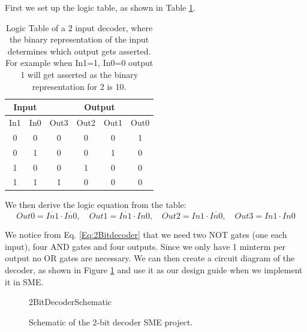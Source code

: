         First we set up the logic table, as shown in Table \ref{LogicTable:2BitDecoder}. 
        \begin{table}[h!]
            \centering
            \begin{tabular}{|c|c||c|c|c|c|}
                \hline
                \multicolumn{2}{|c||}{\textbf{Input}}& \multicolumn{4}{c|}{\textbf{Output}}                  \\ \hline
                In1        & In0        & Out3 & Out2 & Out1 & Out0 \\ \hline
                0          & 0          & 0    & 0    & 0    & 1    \\ \hline
                0          & 1          & 0    & 0    & 1    & 0    \\ \hline
                1          & 0          & 0    & 1    & 0    & 0    \\ \hline
                1          & 1          & 1    & 0    & 0    & 0    \\ \hline
            \end{tabular}
            \caption{Logic Table of a 2 input decoder, where the binary representation of the input determines which output gets asserted. For example when In1=1, In0=0 output 1 will get asserted as the binary representation for 2 is 10.}
            \label{LogicTable:2BitDecoder}
        \end{table}
    
        We then derive the logic equation from the table: 
        \begin{equation}
        \label{Eq:2Bitdecoder}
                Out0 = \overline{In1} \cdot \overline{In0}, \quad
                Out1 = \overline{In1} \cdot In0, \quad
                Out2 = In1 \cdot \overline{In0}, \quad
                Out3 = In1 \cdot In0
        \end{equation}
        
        We notice from Eq. \ref{Eq:2Bitdecoder} that we need two NOT gates (one each input), four AND gates and four outputs. Since we only have 1 minterm per output no OR gates are necessary.
        We can then create a circuit diagram of the decoder, as shown in Figure \ref{fig:2BitDecoderSchematic} and use it as our design guide when we implement it in SME.
        \begin{figure}[h!]
            \centering
            {2BitDecoderSchematic}
            \caption{Schematic of the 2-bit decoder SME project.}
            \label{fig:2BitDecoderSchematic}
        \end{figure}
        
